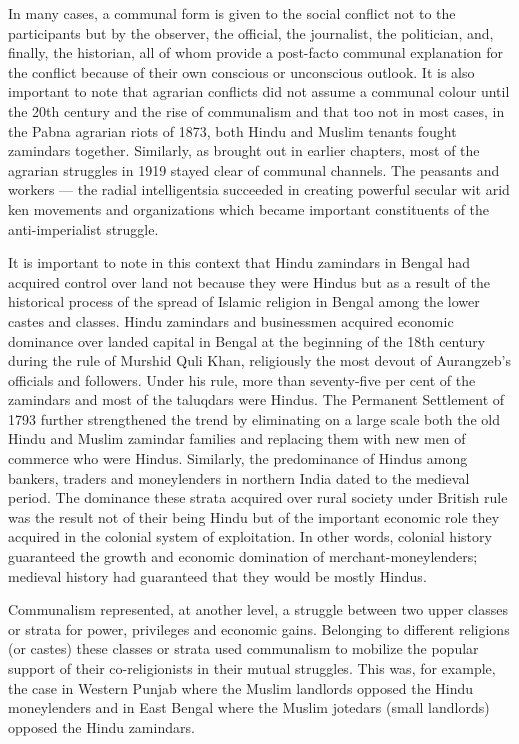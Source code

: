 \begin{multicols}{2}
In many cases, a communal form is given to the social conflict not to the participants but by the observer, the official, the journalist, the politician, and, finally, the historian, all of whom provide a post-facto communal explanation for the conflict because of their own conscious or unconscious outlook. It is also important to note that agrarian conflicts did not assume a communal colour until the 20th century and the rise of communalism and that too not in most cases, in the Pabna agrarian riots of 1873, both Hindu and Muslim tenants fought zamindars together. Similarly, as brought out in earlier chapters, most of the agrarian struggles in 1919 stayed clear of communal channels. The peasants and workers --- the radial intelligentsia succeeded in creating powerful secular wit arid ken movements and organizations which became important constituents of the anti-imperialist struggle.

It is important to note in this context that Hindu zamindars in Bengal had acquired control over land not because they were Hindus but as a result of the historical process of the spread of Islamic religion in Bengal among the lower castes and classes. Hindu zamindars and businessmen acquired economic dominance over landed capital in Bengal at the beginning of the 18th century during the rule of Murshid Quli Khan, religiously the most devout of Aurangzeb's officials and followers. Under his rule, more than seventy-five per cent of the zamindars and most of the taluqdars were Hindus. The Permanent Settlement of 1793 further strengthened the trend by eliminating on a large scale both the old Hindu and Muslim zamindar families and replacing them with new men of commerce who were Hindus. Similarly, the predominance of Hindus among bankers, traders and moneylenders in northern India dated to the medieval period. The dominance these strata acquired over rural society under British rule was the result not of their being Hindu but of the important economic role they acquired in the colonial system of exploitation. In other words, colonial history guaranteed the growth and economic domination of merchant-moneylenders; medieval history had guaranteed that they would be mostly Hindus.

Communalism represented, at another level, a struggle between two upper classes or strata for power, privileges and economic gains. Belonging to different religions (or castes) these classes or strata used communalism to mobilize the popular support of their co-religionists in their mutual struggles. This was, for example, the case in Western Punjab where the Muslim landlords opposed the Hindu moneylenders and in East Bengal where the Muslim jotedars (small landlords) opposed the Hindu zamindars.


\end{multicols}

